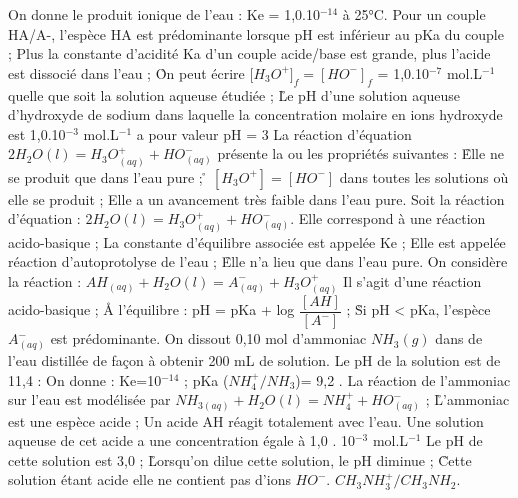 \q	
On donne le produit ionique de l’eau : Ke = 1,0.10$^{-14}$ à 25°C.
\rv
Pour un couple HA/A-, l’espèce HA est prédominante lorsque pH est inférieur au pKa du couple ;
\rv
Plus la constante d’acidité Ka d’un couple acide/base est grande, plus l’acide est dissocié dans l’eau ;
\r
On peut écrire [$H_3O^+]_f = [HO^{-}]_f$ = 1,0.10$^{-7}$ mol.L$^{-1}$ quelle que soit la solution aqueuse étudiée ;
\r	
Le pH d’une solution aqueuse d’hydroxyde de sodium dans laquelle la concentration molaire en ions hydroxyde est 1,0.10$^{-3}$ mol.L$^{-1}$ a pour valeur pH = 3 
\q	
La réaction d’équation $2 H_2O(l) = H_3O^+_{(aq)}  + HO^{-}_{(aq)}$ présente la ou les propriétés suivantes :
\r
Elle ne se produit que dans l’eau pure ; 
\r
$[H_3O^+] = [HO^{-}]$  dans toutes les solutions où elle se produit ;
\rv
Elle a un avancement très faible dans l’eau pure.
 \q	
Soit la réaction d’équation :	$2 H_2O(l) = H_3O^+_{(aq)}  +  HO^{-}_{(aq)}.$
\rv
Elle correspond à une réaction acido-basique ;
\rv
La constante d’équilibre associée est appelée Ke ; 
\rv
Elle est appelée réaction d’autoprotolyse de l’eau ;
\r
Elle n’a lieu que dans l’eau pure.
   \q	On considère la réaction :	 $AH_{(aq)} + H_2O(l) = A^-_{(aq)} + H_3O^+_{(aq)}$
\rv
Il s’agit d’une réaction acido-basique ;
\r 	
A l’équilibre : pH = pKa + log $\dfrac{[AH]}{[A^-]}$  ;
\r
Si pH < pKa, l’espèce $A^-_{(aq)}$ est prédominante.
\q
On dissout 0,10 mol d’ammoniac $NH_3(g)$ dans de l’eau distillée de façon à obtenir 200 mL de solution.
Le pH de la solution est de 11,4 :
On donne :    Ke=10$^{-14}$ ;     pKa ($NH_4^+/NH_3$)=  9,2 .
\rv
La réaction de l’ammoniac sur l’eau est modélisée par $NH_{3(aq)} + H_2O(l) = NH_4^+ + HO^{-}_{(aq)}$ ;
\r
L’ammoniac est une espèce acide ;
\q	
Un acide AH réagit totalement avec l’eau. Une solution aqueuse de cet acide a une concentration égale à 1,0 . 10$^{-3}$ mol.L$^{-1}$ 
\rv
Le pH de cette solution est 3,0 ;
\r
Lorsqu’on dilue cette solution, le pH diminue ;
\r
Cette solution étant acide elle ne contient pas d’ions $HO^{-}$.
\rv
 	$CH_3NH_3^+ / CH_3NH_2$.

